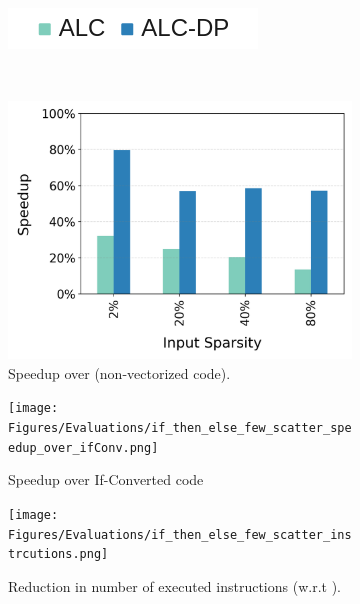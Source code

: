 \begin{figure}[t]
  \centering
  \begin{subfigure}{5cm}
    \centering
    \includegraphics[width=\textwidth]{Figures/Evaluations/Legend.png}
  \end{subfigure}\\
  \begin{subfigure}{.499\textwidth}
    \centering
    \includegraphics[width=\textwidth]{Figures/Evaluations/if_then_else_few_scatter_speedup.png}
    \caption{Speedup over \scalar (non-vectorized code).}
     \label{fig:if-then-else-few-scatter-speedup}
  \end{subfigure}%
  \begin{subfigure}{.499\textwidth}
        \centering
    \texttt{[image: Figures/Evaluations/if\_then\_else\_few\_scatter\_speedup\_over\_ifConv.png]}
    \caption{Speedup over If-Converted code}
    \label{fig:if-then-else-few-scatter-xppedup-over-ifConv}
  \end{subfigure}
  \begin{subfigure}{.499\textwidth}
    \centering
    \texttt{[image: Figures/Evaluations/if\_then\_else\_few\_scatter\_instrcutions.png]}
    \caption{Reduction in number of executed instructions (w.r.t \scalar).}
    \label{fig:if-then-else-few-scatter-inst}
  \end{subfigure}%
  \begin{subfigure}{.499\textwidth}

\end{subfigure}
\end{figure}
